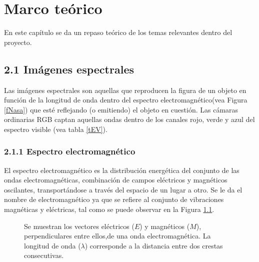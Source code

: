 \chapter{Marco teórico} 
\label{Capitulo2} 
En este capítulo se da un repaso teórico de los temas relevantes dentro del proyecto.

\section{2.1 Imágenes espectrales} 
Las imágenes espectrales son aquellas que reproducen la figura de un objeto en función de la longitud de onda dentro del espectro electromagnético(vea Figura \ref{fNasa}) que esté reflejando (o emitiendo) el objeto en cuestión. Las cámaras ordinarias RGB captan aquellas ondas dentro de los canales rojo, verde y azul del espectro visible (vea tabla \ref{tEV}).
\subsection{2.1.1 Espectro electromagnético}
El espectro electromagnético es la distribución energética del conjunto de las ondas electromagnéticas, combinación de campos eléctricos y magnéticos oscilantes, transportándose a través del espacio de un lugar a otro. Se le da el nombre de electromagnético ya que se refiere al conjunto de vibraciones magnéticas y eléctricas, tal como se puede observar en la Figura \ref{fPropagacion}.

\begin{figure}[h]
  \centering
  \centering
  \caption{Se muestran los vectores eléctricos ($E$) y magnéticos ($M$), perpendiculares entre ellos,de una onda electromagnética. La longitud de onda ($\lambda$) corresponde a la distancia entre dos crestas consecutivas. \cite{chile}}
  \label{fPropagacion}
\end{figure}

